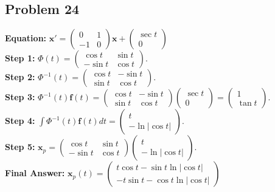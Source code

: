 \documentclass[11pt]{article}
\begin{document}
\subsection*{Problem 24}
\textbf{Equation:} $\mathbf{x}' = \begin{pmatrix} 0 & 1 \\ -1 & 0 \end{pmatrix} \mathbf{x} + \begin{pmatrix} \sec t \\ 0 \end{pmatrix}$ \\
\textbf{Step 1:} $\Phi(t) = \begin{pmatrix} \cos t & \sin t \\ -\sin t & \cos t \end{pmatrix}$. \\
\textbf{Step 2:} $\Phi^{-1}(t) = \begin{pmatrix} \cos t & -\sin t \\ \sin t & \cos t \end{pmatrix}$. \\
\textbf{Step 3:} $\Phi^{-1}(t)\mathbf{f}(t) = \begin{pmatrix} \cos t & -\sin t \\ \sin t & \cos t \end{pmatrix} \begin{pmatrix} \sec t \\ 0 \end{pmatrix} = \begin{pmatrix} 1 \\ \tan t \end{pmatrix}$. \\
\textbf{Step 4:} $\int \Phi^{-1}(t)\mathbf{f}(t) dt = \begin{pmatrix} t \\ -\ln|\cos t| \end{pmatrix}$. \\
\textbf{Step 5:} $\mathbf{x}_p = \begin{pmatrix} \cos t & \sin t \\ -\sin t & \cos t \end{pmatrix} \begin{pmatrix} t \\ -\ln|\cos t| \end{pmatrix}$. \\
\textbf{Final Answer:} $\mathbf{x}_p(t) = \begin{pmatrix} t\cos t - \sin t \ln|\cos t| \\ -t\sin t - \cos t \ln|\cos t| \end{pmatrix}$
\end{document}

